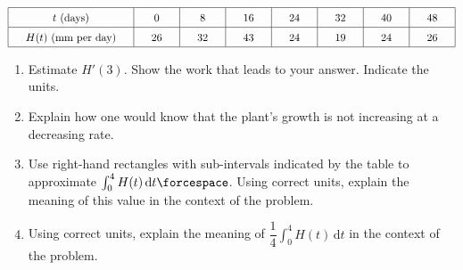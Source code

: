  \begin{align*}
    \arraycolsep=16.5pt\def\arraystretch{1.5}
    \begin{array}{|c|c|c|c|c|c|c|c|}
        \hline
        t \text{ (days)} & 0 & 8 & 16 & 24 & 32 & 40 & 48 \\ \hline
        H(t) \text{ (mm per day)} & 26 & 32 & 43 & 24 & 19 & 24 & 26 \\
        \hline
    \end{array}
\end{align*}
\begin{enumerate}[label=\hspace{11pt}(\alph*), align=left, leftmargin=*, labelsep=0.25em]
    \item Estimate $H'(3)$. Show the work that leads to your answer. Indicate the units. 
    \item Explain how one would know that the plant's growth is not increasing at a decreasing rate.
    \item Use right-hand rectangles with sub-intervals indicated by the table to approximate $\int_0^4 H(t) \,\mathrm{d}t \forcespace$. Using correct units, explain the meaning of this value in the context of the problem. 
    \item Using correct units, explain the meaning of $\dfrac{1}{4}\int_0^4 H(t) \,\mathrm{d}t$ in the context of the problem.
\end{enumerate} \vspace{11pt}

